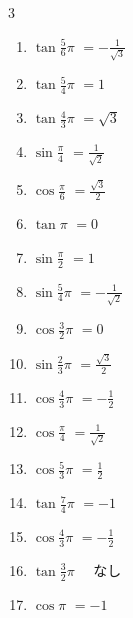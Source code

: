 \begin{multicols}{3}
\begin{enumerate}
  \item $\displaystyle \tan{\frac{5}{6}\pi}$
        $\displaystyle =-\frac{1}{\sqrt{3}}$

  \item $\displaystyle \tan{\frac{5}{4}\pi}$
        $\displaystyle =1$

  \item $\displaystyle \tan{\frac{4}{3}\pi}$
        $\displaystyle =\sqrt{3}$

  \item $\displaystyle \sin{\frac{\pi}{4}}$
        $\displaystyle =\frac{1}{\sqrt{2}}$

  \item $\displaystyle \cos{\frac{\pi}{6}}$
        $\displaystyle =\frac{\sqrt{3}}{2}$

  \item $\displaystyle \tan{\pi}$
        $\displaystyle =0$

  \item $\displaystyle \sin{\frac{\pi}{2}}$
        $\displaystyle =1$

  \item $\displaystyle \sin{\frac{5}{4}\pi}$
        $\displaystyle =-\frac{1}{\sqrt{2}}$

  \item $\displaystyle \cos{\frac{3}{2}\pi}$
        $\displaystyle =0$

  \item $\displaystyle \sin{\frac{2}{3}\pi}$
        $\displaystyle =\frac{\sqrt{3}}{2}$

  \item $\displaystyle \cos{\frac{4}{3}\pi}$
        $\displaystyle =-\frac{1}{2}$

  \item $\displaystyle \cos{\frac{\pi}{4}}$
        $\displaystyle =\frac{1}{\sqrt{2}}$

  \item $\displaystyle \cos{\frac{5}{3}\pi}$
        $\displaystyle =\frac{1}{2}$

  \item $\displaystyle \tan{\frac{7}{4}\pi}$
        $\displaystyle =-1$

  \item $\displaystyle \cos{\frac{4}{3}\pi}$
        $\displaystyle =-\frac{1}{2}$

  \item $\displaystyle \tan{\frac{3}{2}\pi}$
        $\displaystyle \quad なし$

  \item $\displaystyle \cos{\pi}$
        $\displaystyle =-1$


\end{enumerate}
\end{multicols}

